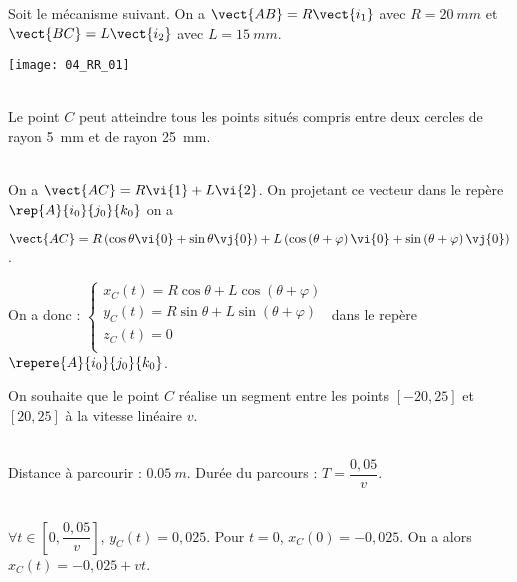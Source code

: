 \normaltrue
\correctionfalse


\setcounter{numques}{0}
\ifcorrection
\else
{}
\fi

\ifprof
\else
Soit le mécanisme suivant. On a $\vect{AB}=R\vect{i_1}$ avec $R=\SI{20}{mm}$ et  
$\vect{BC}=L\vect{i_2}$ avec $L=\SI{15}{mm}$.
\begin{center}
\texttt{[image: 04\_RR\_01]}
\end{center}
\fi

\ifprof~\\
Le point $C$ peut atteindre tous les points situés compris entre deux cercles de rayon \SI{5}{mm} et de rayon \SI{25}{mm}.
\else
\fi

\ifprof~\\
On  a $\vect{AC}=R\vi{1}+L\vi{2}$. On projetant ce vecteur dans le repère $\rep{A}{i_0}{j_0}{k_0}$ on a 

$\vect{AC}=R\left(\cos\theta \vi{0} + \sin\theta \vj{0}\right) +L\left(\cos\left(\theta+\varphi\right) \vi{0} + \sin\left(\theta+\varphi\right) \vj{0}\right)$. 

On a donc :
$\left\{
\begin{array}{l}
x_C(t)= R\cos\theta  +L\cos\left(\theta+\varphi\right)  \\
y_C(t)= R \sin\theta + L\sin\left(\theta+\varphi\right)\\
z_C(t)= 0\\
\end{array}
\right.
$ dans le repère $\repere{A}{i_0}{j_0}{k_0}$.
\else
\fi

\ifprof
\else
On souhaite que le point $C$ réalise un segment entre les points $[-20,25]$ et $[20,25]$ à la vitesse linéaire $v$. 
\fi


\ifprof ~\\
Distance à parcourir : $\SI{0,05}{m}$. Durée du parcours : $T=\dfrac{0,05}{v}$.
\else
\fi


\ifprof ~\\
$\forall t \in \left[0,\dfrac{0,05}{v}\right]$, $y_C(t)=0,025$. 
Pour $t=0$, $x_C(0)=-0,025$. On a alors $x_C(t)=-0,025+vt$.  

